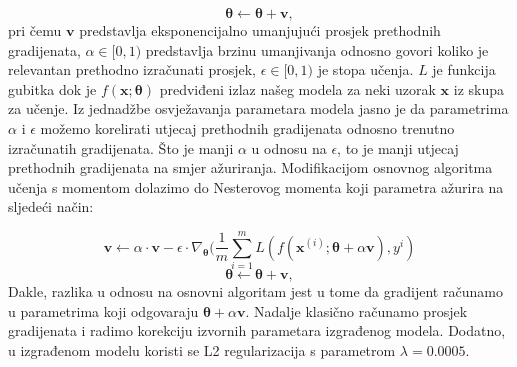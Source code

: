 \documentclass[times, utf8, diplomski]{fer}
\theoremstyle{definition}
\begin{document}
\begin{equation}
\bm{\theta} \leftarrow \bm{\theta} + \bm{v},
\end{equation}
pri čemu $\bm{v}$ predstavlja eksponencijalno umanjujući prosjek prethodnih gradijenata, $\alpha \in [0, 1)$ predstavlja brzinu umanjivanja odnosno govori koliko je relevantan prethodno izračunati prosjek, $\epsilon \in [0, 1)$ je stopa učenja. $L$ je funkcija gubitka dok je $f(\bm{x}; \bm{\theta})$ predviđeni izlaz našeg modela za neki uzorak $\bm{x}$ iz skupa za učenje. Iz jednadžbe osvježavanja parametara modela jasno je da parametrima $\alpha$ i $\epsilon$ možemo korelirati utjecaj prethodnih gradijenata odnosno trenutno izračunatih gradijenata. Što je manji $\alpha$ u odnosu na $\epsilon$, to je manji utjecaj prethodnih gradijenata na smjer ažuriranja.
Modifikacijom osnovnog algoritma učenja s momentom dolazimo do Nesterovog momenta koji parametra ažurira na sljedeći način:

\begin{equation}
\bm{v} \leftarrow \alpha \cdot \bm{v} - \epsilon \cdot \nabla_{\bm{\theta}}(\frac{1}{m} \sum_{i=1}^{m}L(f(\bm{x}^{(i)}; \bm{\theta} + \alpha \bm{v}), y^i )
\end{equation}
\begin{equation}
\bm{\theta} \leftarrow \bm{\theta} + \bm{v},
\end{equation}
Dakle, razlika u odnosu na osnovni algoritam jest u tome da gradijent računamo u parametrima koji odgovaraju $\bm{\theta} + \alpha \bm{v}$. Nadalje klasično računamo prosjek gradijenata i radimo korekciju izvornih parametara izgrađenog modela. Dodatno, u izgrađenom modelu koristi se L2 regularizacija s parametrom $\lambda = 0.0005$.
\end{document}
